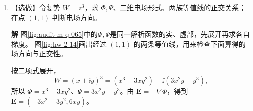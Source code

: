 \documentclass[11pt,openany,fontset=fandol]{ctexbook}
\theoremstyle{plain}\newtheorem{theorem}{定理}[chapter]\newtheorem{proposition}[theorem]{命题}
\theoremstyle{definition}\newtheorem{definition}{定义}[chapter]\newtheorem{example}{例}[chapter]
\theoremstyle{remark}\newtheorem*{remark}{说明}
\newcommand{\SolutionStart}{\par\nobreak\medskip\nobreak\noindent\textbf{解}\quad\ignorespaces}
\newenvironment{solution}{\SolutionStart}{\par\medskip}
\newcommand{\vct}[1]{\bm{#1}}\newcommand{\Rea}{\operatorname{Re}}\newcommand{\Ima}{\operatorname{Im}}
\begin{document}
\begin{enumerate}[label=2.\arabic*]
\begin{solution}
若改为包含原点的实心球，场在原点发散，不满足在整个体积内连续可微的条件。球面通量仍为 $4\pi C$；不能把仅在 $r>0$ 得到的零散度结论未经处理延伸到原点。

两球面大小不同但径向场按 $r^{-2}$ 变化，通量的模相同；图中相反的法向使两项恰好抵消。
\end{solution}

\item \begin{minipage}[t]{\linewidth}
【选做】令复势 $W=z^3$，求 $\Phi,\Psi$、二维电场形式、两族等值线的正交关系；在点 $(1,1)$ 判断电场方向。
\end{minipage}

\begin{solution}
图\ref{fig:audit-m-q-065}中的$\Phi,\Psi$是同一解析函数的实、虚部，先展开再求各自梯度。
图\ref{fig:hw-2-14}画出经过 $(1,1)$ 的两条等值线，用来检查下面算得的场方向与正交性。

按二项式展开，
\[
W=(x+\ii y)^3=(x^3-3xy^2)+\ii(3x^2y-y^3),
\]
所以 $\Phi=x^3-3xy^2$、$\Psi=3x^2y-y^3$。由 $\vct E=-\nabla\Phi$，得到 $\vct E=(-3x^2+3y^2,6xy)$。


\end{solution}
\end{enumerate}
\end{document}
